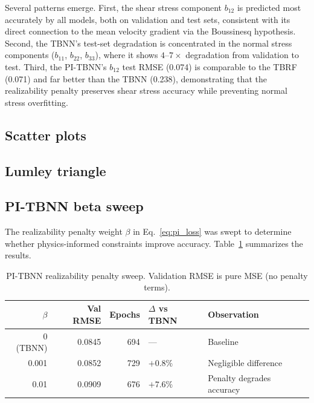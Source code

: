 Several patterns emerge.
First, the shear stress component $b_{12}$ is predicted most accurately by all models, both on validation and test sets, consistent with its direct connection to the mean velocity gradient via the Boussinesq hypothesis.
Second, the TBNN's test-set degradation is concentrated in the normal stress components ($b_{11}$, $b_{22}$, $b_{33}$), where it shows $4$--$7\times$ degradation from validation to test.
Third, the PI-TBNN's $b_{12}$ test RMSE (0.074) is comparable to the TBRF (0.071) and far better than the TBNN (0.238), demonstrating that the realizability penalty preserves shear stress accuracy while preventing normal stress overfitting.

\subsection{Scatter plots}


\subsection{Lumley triangle}


\subsection{PI-TBNN beta sweep}
\label{sec:pi_sweep}

The realizability penalty weight $\beta$ in Eq.~\eqref{eq:pi_loss} was swept to determine whether physics-informed constraints improve accuracy.
Table~\ref{tab:pi_sweep} summarizes the results.

\begin{table}[htbp]
\centering
\caption{PI-TBNN realizability penalty sweep. Validation RMSE is pure MSE (no penalty terms).}
\label{tab:pi_sweep}
\begin{tabular}{rrrll}
\toprule
$\beta$ & Val RMSE & Epochs & $\Delta$ vs TBNN & Observation \\
\midrule
0 (TBNN)   & 0.0845 & 694 & ---      & Baseline \\
0.001      & 0.0852 & 729 & $+0.8\%$  & Negligible difference \\
0.01       & 0.0909 & 676 & $+7.6\%$  & Penalty degrades accuracy \\
\bottomrule
\end{tabular}
\end{table}

